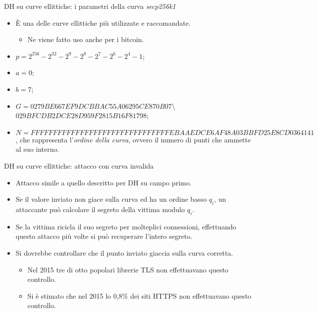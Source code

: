 \documentclass[11pt,svgnames,smaller,aspectratio=169,italian]{beamer}
\begin{document}
\begin{frame}{DH su curve ellittiche: i parametri della curva \emph{secp256k1}}
	\begin{itemize}
		\item È una delle curve ellittiche più utilizzate e raccomandate.
			\begin{itemize}
				\item Ne viene fatto uso anche per i bitcoin.
			\end{itemize}
		\item $p = 2^{256} - 2^{32} - 2^{9} - 2^{8} - 2^{7} - 2^{6} - 2^{4} - 1$;
		\item $a = 0$;
		\item $b =  7$;
		\item $G = 02 79BE667E F9DCBBAC 55A06295 CE870B07$\textbackslash \\
		$029BFCDB 2DCE28D9 59F2815B 16F81798$;
		\item $N = FFFFFFFF FFFFFFFF FFFFFFFF FFFFFFFE BAAEDCE6 AF48A03B BFD25E8C D0364141$, che rappresenta l'\emph{ordine della curva}, ovvero il numero di punti che ammette al suo interno.
	\end{itemize}
\end{frame}

\begin{frame}{DH su curve ellittiche: attacco con curva invalida}
	\begin{itemize}
		\item Attacco simile a quello descritto per DH su campo primo.
		\item Se il valore inviato non giace sulla curva ed ha un ordine basso $q_{i}$, un attaccante può calcolare il segreto della vittima modulo $q_{i}$.
		\item Se la vittima ricicla il suo segreto per molteplici connessioni, effettuando questo attacco più volte si può recuperare l'intero segreto.
		\item Si dovrebbe controllare che il punto inviato giaccia sulla curva corretta.
			\begin{itemize}
				\item Nel 2015 tre di otto popolari librerie TLS non effettuavano questo controllo.
				\item Si è stimato che nel 2015 lo 0,8\% dei siti HTTPS non effettuavano questo controllo.
			\end{itemize}
	\end{itemize}
\end{frame}
\end{document}
